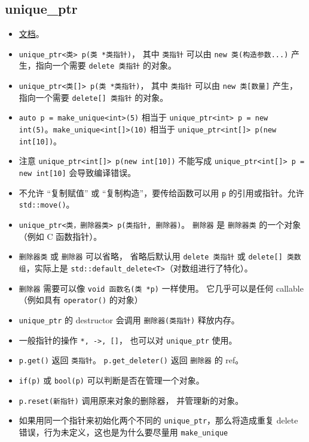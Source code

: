 
\begin{issues}
\issueDraft
\end{issues}

\subsection{unique\_ptr}
\begin{itemize}
\item \href{https://en.cppreference.com/w/cpp/memory/unique_ptr}{文档}。
\item \verb`unique_ptr<类> p(类 *类指针)`， 其中 \verb`类指针` 可以由 \verb`new 类(构造参数...)` 产生，指向一个需要 \verb`delete 类指针` 的对象。
\item \verb`unique_ptr<类[]> p(类 *类指针)`， 其中 \verb`类指针` 可以由 \verb`new 类[数量]` 产生，指向一个需要 \verb`delete[] 类指针` 的对象。
\item \verb`auto p = make_unique<int>(5)` 相当于 \verb`unique_ptr<int> p = new int(5)`。\verb`make_unique<int[]>(10)` 相当于 \verb`unique_ptr<int[]> p(new int[10])`。
\item 注意 \verb`unique_ptr<int[]> p(new int[10])` 不能写成 \verb`unique_ptr<int[]> p = new int[10]` 会导致编译错误。
\item 不允许 “复制赋值” 或 “复制构造”，要传给函数可以用 \verb`p` 的引用或指针。允许 \verb`std::move()`。
\item \verb`unique_ptr<类，删除器类> p(类指针, 删除器)`。 \verb`删除器` 是 \verb`删除器类` 的一个对象（例如 C 函数指针）。
\item \verb`删除器类` 或 \verb`删除器` 可以省略， 省略后默认用 \verb`delete 类指针` 或 \verb`delete[] 类数组`，实际上是 \verb`std::default_delete<T>`（对数组进行了特化）。
\item \verb`删除器` 需要可以像 \verb`void 函数名(类 *p)` 一样使用。 它几乎可以是任何 callable（例如具有 \verb`operator()` 的对象）
\item \verb`unique_ptr` 的 destructor 会调用 \verb`删除器(类指针)` 释放内存。
\item 一般指针的操作 \verb`*, ->, []`， 也可以对 \verb`unique_ptr` 使用。
\item \verb`p.get()` 返回 \verb`类指针`。 \verb`p.get_deleter()` 返回 \verb`删除器` 的 ref。
\item \verb`if(p)` 或 \verb`bool(p)` 可以判断是否在管理一个对象。
\item \verb`p.reset(新指针)` 调用原来对象的删除器， 并管理新的对象。
\item 如果用同一个指针来初始化两个不同的 \verb`unique_ptr`，那么将造成重复 delete 错误，行为未定义，这也是为什么要尽量用 \verb`make_unique`
\end{itemize}
